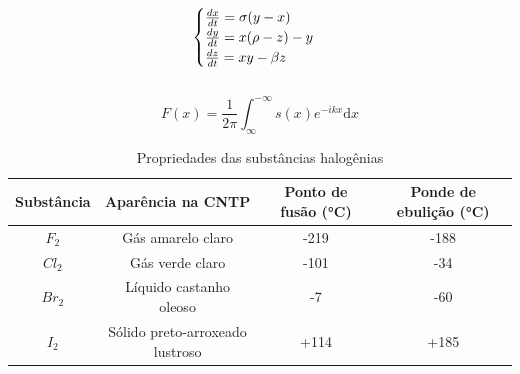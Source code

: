 \documentclass[
	12pt,				%
	openright,			%
	twoside,			%
	a4paper,			%
	english,			%
	french,				%
	spanish,			%
	brazil,				%
	]{abntex2}
\begin{document}
	\begin{equation}{\displaystyle}
	  \begin{cases}
	  \frac{dx}{dt}=\sigma(y-x)\\
	  \frac{dy}{dt}=x(\rho-z)-y\\
	  \frac{dz}{dt}=xy-\beta z
	  \end{cases}
	\end{equation}\\

	\begin{equation}
	  F(x)=\frac{1}{2\pi}\int_{\infty}^{-\infty}s(x)e^{-ikx}\mathrm{d}x
	\end{equation}

\newpage

    \begin{table}[htb]
      \begin{center}
      	\caption{Propriedades das substâncias halogênias}
      	\begin{tabular}{cccc}
      	\textbf{Substância} & \textbf{Aparência na CNTP} & \textbf{Ponto de fusão (°C)} & \textbf{Ponde de ebulição (°C)}\\
      	\hline
      	$F_2$ & Gás amarelo claro & -219 & -188\\
      	\hline
      	$Cl_2$ & Gás verde claro & -101 & -34\\
      	\hline
      	$Br_2$ & Líquido castanho oleoso & -7 & -60\\
      	\hline
      	$I_2$ & Sólido preto-arroxeado lustroso & +114 & +185
        \end{tabular}
      \end{center}
    \end{table}

    \begin{table}[htb]

    \end{table}
\end{document}
